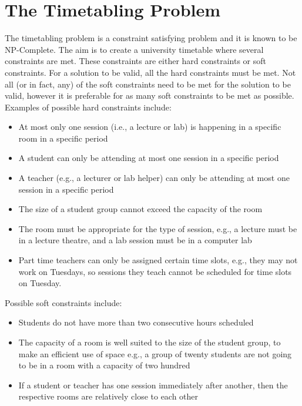 \section{The Timetabling Problem}

The timetabling problem is a constraint satisfying problem and it is known to
be NP-Complete.
The aim is to create a university timetable where several constraints are met.
These constraints are either hard constraints or soft constraints.
For a solution to be valid, all the hard constraints must be met.
Not all (or in fact, any) of the soft constraints need to be met for the
solution to be valid, however it is preferable for as many soft constraints to
be met as possible.
Examples of possible hard constraints include:

\begin{itemize}
	\item At most only one session (i.e., a lecture or lab) is happening in a 
		specific room in a specific period
	\item A student can only be attending at most one session in a specific 
		period
	\item A teacher (e.g., a lecturer or lab helper) can only be attending at 
		most one session in a specific period
	\item The size of a student group cannot exceed the capacity of the room
	\item The room must be appropriate for the type of session, e.g., a lecture 
		must be in a lecture theatre, and a lab session must be in a computer 
		lab
	\item Part time teachers can only be assigned certain time slots, e.g., they
		may not work on Tuesdays, so sessions they teach cannot be scheduled
		for time slots on Tuesday.
\end{itemize}

Possible soft constraints include:

\begin{itemize}
	\item Students do not have more than two consecutive hours scheduled
	\item The capacity of a room is well suited to the size of the student
		group, to make an efficient use of space e.g., a group of twenty
		students are not going to be in a room with a capacity of two hundred
	\item If a student or teacher has one session immediately after another,
		then the respective rooms are relatively close to each other
\end{itemize}

